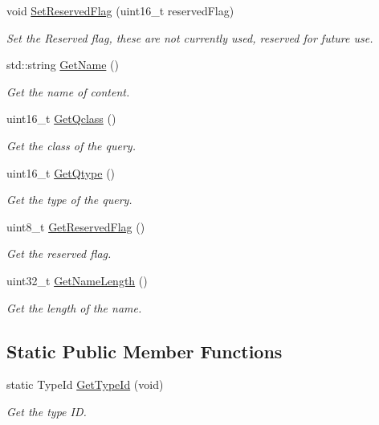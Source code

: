 \begin{DoxyCompactItemize}
void \hyperlink{classns3_1_1DnsPlusQuestionHeader_a7ee32b2fd37340e16532f04670549d70}{Set\-Reserved\-Flag} (uint16\-\_\-t reserved\-Flag)
\begin{DoxyCompactList}\small\item\em Set the Reserved flag, these are not currently used, reserved for future use. \end{DoxyCompactList}\item 
std\-::string \hyperlink{classns3_1_1DnsPlusQuestionHeader_ab999fca8805a988c4917b330594160f5}{Get\-Name} ()
\begin{DoxyCompactList}\small\item\em Get the name of content. \end{DoxyCompactList}\item 
uint16\-\_\-t \hyperlink{classns3_1_1DnsPlusQuestionHeader_a221ec46b8f368cd3e7485bb76a2bbc5a}{Get\-Qclass} ()
\begin{DoxyCompactList}\small\item\em Get the class of the query. \end{DoxyCompactList}\item 
uint16\-\_\-t \hyperlink{classns3_1_1DnsPlusQuestionHeader_a08f7695d808ec124e8a928a5f614b469}{Get\-Qtype} ()
\begin{DoxyCompactList}\small\item\em Get the type of the query. \end{DoxyCompactList}\item 
uint8\-\_\-t \hyperlink{classns3_1_1DnsPlusQuestionHeader_a860734d80f335635c2c80317ec7de319}{Get\-Reserved\-Flag} ()
\begin{DoxyCompactList}\small\item\em Get the reserved flag. \end{DoxyCompactList}\item 
uint32\-\_\-t \hyperlink{classns3_1_1DnsPlusQuestionHeader_a48b9d74d2daecb56ce542b70f196b198}{Get\-Name\-Length} ()
\begin{DoxyCompactList}\small\item\em Get the length of the name. \end{DoxyCompactList}\end{DoxyCompactItemize}
\subsection*{Static Public Member Functions}
\begin{DoxyCompactItemize}
\item 
static Type\-Id \hyperlink{classns3_1_1DnsPlusQuestionHeader_adfca2ccbab64ac86e4e745e761146096}{Get\-Type\-Id} (void)
\begin{DoxyCompactList}\small\item\em Get the type I\-D. \end{DoxyCompactList}\end{DoxyCompactItemize}
